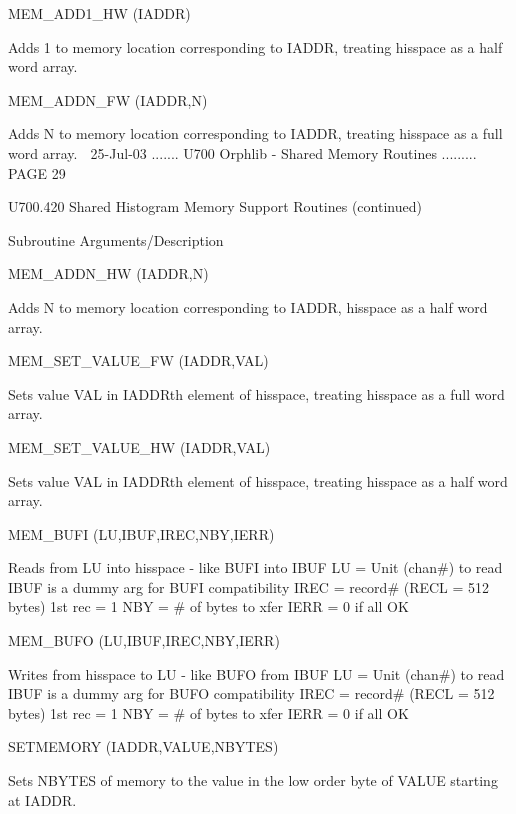    MEM_ADD1_HW       (IADDR)
 
                      Adds 1 to memory location corresponding to IADDR,
                      treating hisspace as a half word array.
 
   MEM_ADDN_FW       (IADDR,N)
 
                      Adds N to memory location corresponding to IADDR,
                      treating hisspace as a full word array.
    
   25-Jul-03 ....... U700  Orphlib - Shared Memory Routines ......... PAGE  29
 
 
   U700.420  Shared Histogram Memory Support Routines (continued)
 
   Subroutine         Arguments/Description
 
   MEM_ADDN_HW       (IADDR,N)
 
                      Adds N to memory location corresponding to IADDR,
                      hisspace as a half word array.
 
   MEM_SET_VALUE_FW  (IADDR,VAL)
 
                      Sets value VAL in IADDRth element of hisspace,
                      treating hisspace as a full word array.
 
   MEM_SET_VALUE_HW  (IADDR,VAL)
 
                      Sets value VAL in IADDRth element of hisspace,
                      treating hisspace as a half word array.
 
   MEM_BUFI          (LU,IBUF,IREC,NBY,IERR)
 
                      Reads from LU into hisspace - like BUFI into IBUF
                      LU   = Unit (chan#) to read
                      IBUF is a dummy arg for BUFI compatibility
                      IREC = record# (RECL = 512 bytes) 1st rec = 1
                      NBY  = # of bytes to xfer
                      IERR = 0 if all OK
 
   MEM_BUFO          (LU,IBUF,IREC,NBY,IERR)
 
                      Writes from hisspace to LU - like BUFO from IBUF
                      LU   = Unit (chan#) to read
                      IBUF is a dummy arg for BUFO compatibility
                      IREC = record# (RECL = 512 bytes) 1st rec = 1
                      NBY  = # of bytes to xfer
                      IERR = 0 if all OK
 
   SETMEMORY         (IADDR,VALUE,NBYTES)
 
                      Sets NBYTES of memory to the value in the low order
                      byte of VALUE starting at IADDR.
 
